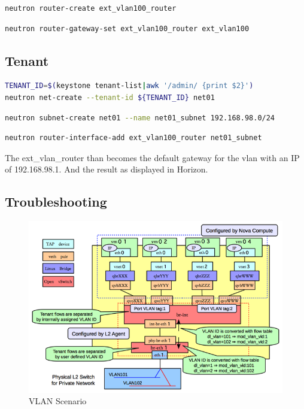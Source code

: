 \documentclass[11pt,letterpaper,oneside]{book}
\begin{document}
\begin{lstlisting}[caption={Create router},language=bash]
neutron router-create ext_vlan100_router 
\end{lstlisting}

\begin{lstlisting}[caption={Set gateway},language=bash]
neutron router-gateway-set ext_vlan100_router ext_vlan100
\end{lstlisting}

\subsection{Tenant}
\begin{lstlisting}[caption={Create network},language=bash]
TENANT_ID=$(keystone tenant-list|awk '/admin/ {print $2}') 
neutron net-create --tenant-id ${TENANT_ID} net01
\end{lstlisting}

\begin{lstlisting}[caption={Create subnet},language=bash]
neutron subnet-create net01 --name net01_subnet 192.168.98.0/24 
\end{lstlisting}
\begin{lstlisting}[caption={Add interface},language=bash]
neutron router-interface-add ext_vlan100_router net01_subnet 
\end{lstlisting}

The ext\_vlan\_router than becomes the default gateway for the vlan with an IP of 192.168.98.1. And the result as displayed in Horizon.

\subsection{Troubleshooting}

\begin{figure}
	\caption{VLAN Scenario}
	\centering
	\label{vlan}
	\includegraphics[scale=0.5]{./pictures/under-the-hood-scenario-2-ovs-compute.png}
\end{figure}
\end{document}
